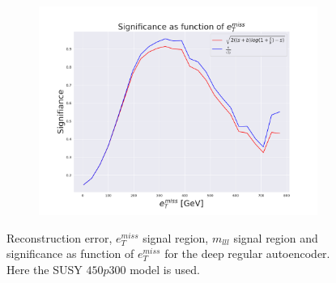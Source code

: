 \begin{figure}[H]
\begin{subfigure}{.40\textwidth}
        \caption{}
        \label{fig:AE_2lep_big_etmiss_450_2}
    \end{subfigure}
    \hfill 
    \begin{subfigure}{.40\textwidth}
        \includegraphics[width=\textwidth]{Figures/AE_testing/big/2lep/significance_etmiss_450p0p0300_-1.0770415453595523.pdf}
        \caption{}
        \label{fig:AE_2lep_big_signi_450_2}
    \end{subfigure}
    \hfill      
    \caption[2lep deep network | $450p300$ | AE | 2]{Reconstruction error, $e_T^{miss}$ signal region, $m_{lll}$ signal region and significance as function of 
    $e_T^{miss}$ for the deep regular autoencoder. Here the SUSY $450p300$ model is used.}
    \label{fig:AE_2lep_big_rec_sig_signi_450_2}
\end{figure}

